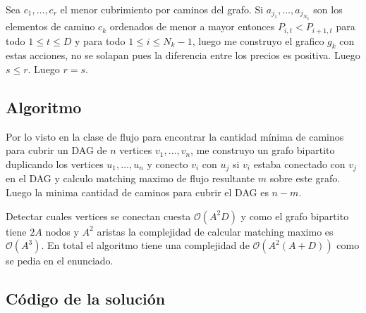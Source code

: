 	Sea $c_1,\dots ,c_r$ el menor cubrimiento por caminos del
	grafo. Si $a_{j_1},\dots ,a_{j_{N_k}}$ son los elementos de
	camino $c_k$ ordenados de menor a mayor entonces $P_{i,t}<P_{i+1,t}$
	para todo $1\leq t\leq D$ y para todo $1\leq i\leq N_k-1$, 
	luego me construyo el grafico $g_k$ con estas acciones, no se
	solapan pues la diferencia entre los precios es positiva.
	Luego $s\leq r$.
	Luego $r=s$.
	
\subsection{Algoritmo}
	Por lo visto en la clase de flujo para encontrar la cantidad mínima 
	de caminos para cubrir un DAG de $n$ vertices
	$v_1,\dots ,v_n$, me construyo un grafo bipartito duplicando los vertices
	$u_1,\dots ,u_n$ y conecto $v_i$ con $u_j$ si $v_i$ estaba conectado con 
	$v_j$ en el DAG y calculo matching maximo de flujo resultante $m$ sobre este grafo. Luego
	la minima cantidad de caminos para cubrir el DAG es $n-m$.
	
	
	Detectar cuales vertices se conectan cuesta $\mathcal{O}(A^2D)$ y como el grafo
	bipartito tiene $2A$ nodos y $A^2$ aristas la complejidad de 
	calcular matching maximo es $\mathcal{O}(A^3)$.
	En total el algoritmo tiene una complejidad de $\mathcal{O}(A^2(A+D))$ como
	se pedia en el enunciado.
\newpage
\subsection{Código de la solución}

